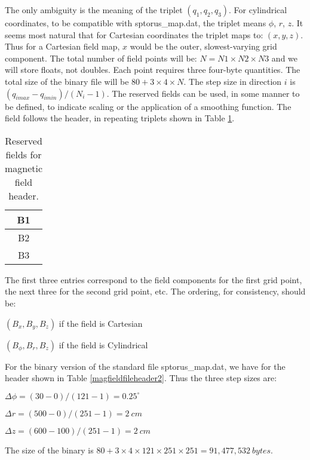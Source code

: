  The only ambiguity is the meaning of the triplet $(q_1, q_2, q_3)$. 
For cylindrical coordinates, to be compatible with sptorus\_map.dat, the triplet means {$\phi$, $r$, $z$}. 
It seems most natural that for Cartesian coordinates the triplet maps to: $(x, y, z)$. 
Thus for a Cartesian field map, $x$ would be the outer, slowest-varying grid component.
The total number of field points will be: $N = N1\times N2\times N3$ and we will store floats, not doubles. 
Each point requires three four-byte quantities. The total size of the binary file will be $80 + 3\times 4\times N$.
The step size in direction $i$ is $(q_{imax} - q_{imin})/(N_i - 1)$.
The reserved fields can be used, in some manner to be defined, to indicate scaling or the application of a smoothing function.
The field follows the header, in repeating triplets shown in Table \ref{reservedfields}.
\begin{table}[t!]
\begin{center}
\begin{tabular}{|c|}\hline
B1 \\[2pt]\hline
B2 \\[2pt]\hline
B3 \\[2pt]\hline
\end{tabular}
\caption{Reserved fields for magnetic field header.}\label{reservedfields}
\end{center}
\end{table}
The first three entries correspond to the field components for the first grid point, the next three for the second grid point, etc. The ordering, for consistency, should be:

$(B_x, B_y, B_z)$ if the field is Cartesian

$(B_\phi, B_r, B_z)$ if the field is Cylindrical

\noindent For the binary version of the standard file sptorus\_map.dat, we have for the header shown in Table \ref{magfieldfileheader2}.
Thus the three step sizes are:

$\Delta\phi = (30-0)/(121-1) = 0.25^\circ$

$\Delta r = (500-0)/(251-1) = 2~ cm$

$\Delta z = (600-100)/(251-1) = 2~ cm$

\noindent The size of the binary is $80 + 3\times4\times121\times251\times251 = 91,477,532~ bytes$.

